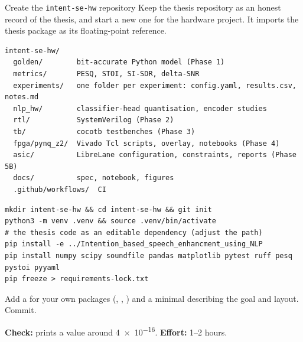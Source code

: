 \begin{stepbox}[label=st:setup:repo]{Create the \texttt{intent-se-hw} repository}
Keep the thesis repository as an honest record of the thesis, and start a new
one for the hardware project. It imports the thesis package as its
floating-point reference.

\begin{lstlisting}[style=plain]
intent-se-hw/
  golden/        bit-accurate Python model (Phase 1)
  metrics/       PESQ, STOI, SI-SDR, delta-SNR
  experiments/   one folder per experiment: config.yaml, results.csv, notes.md
  nlp_hw/        classifier-head quantisation, encoder studies
  rtl/           SystemVerilog (Phase 2)
  tb/            cocotb testbenches (Phase 3)
  fpga/pynq_z2/  Vivado Tcl scripts, overlay, notebooks (Phase 4)
  asic/          LibreLane configuration, constraints, reports (Phase 5B)
  docs/          spec, notebook, figures
  .github/workflows/  CI
\end{lstlisting}

\begin{lstlisting}[style=shell]
mkdir intent-se-hw && cd intent-se-hw && git init
python3 -m venv .venv && source .venv/bin/activate
# the thesis code as an editable dependency (adjust the path)
pip install -e ../Intention_based_speech_enhancment_using_NLP
pip install numpy scipy soundfile pandas matplotlib pytest ruff pesq pystoi pyyaml
pip freeze > requirements-lock.txt
\end{lstlisting}

Add a  for your own packages (,
, ) and a minimal  describing the
goal and layout. Commit.

\textbf{Check:}  prints a value around \num{4e-16}.
\textbf{Effort:} 1--2 hours.
\end{stepbox}

